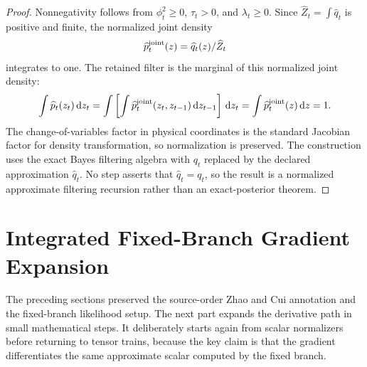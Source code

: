 \documentclass[11pt]{article}
\numberwithin{equation}{section}
\newcommand{\dd}{\,\mathrm d}
\begin{document}
\begin{proof}
Nonnegativity follows from
\(\phi_t^2\ge0\), \(\tau_t>0\), and \(\lambda_t\ge0\).  Since
\(\widehat Z_t=\int\widehat q_t\) is positive and finite, the normalized joint
density
\[
    \widehat p_t^{\rm joint}(z)
    =
    \widehat q_t(z)/\widehat Z_t
\]
integrates to one.  The retained filter is the marginal of this normalized
joint density:
\[
    \int \widehat p_t(z_t)\dd z_t
    =
    \int
    \left[
    \int \widehat p_t^{\rm joint}(z_t,z_{t-1})\dd z_{t-1}
    \right]\dd z_t
    =
    \int \widehat p_t^{\rm joint}(z)\dd z
    =
    1.
\]
The change-of-variables factor in physical coordinates is the standard
Jacobian factor for density transformation, so normalization is preserved.  The
construction uses the exact Bayes filtering algebra with \(q_t\) replaced by
the declared approximation \(\widehat q_t\).  No step asserts that
\(\widehat q_t=q_t\), so the result is a normalized approximate filtering
recursion rather than an exact-posterior theorem.
\end{proof}


\section{Integrated Fixed-Branch Gradient Expansion}

The preceding sections preserved the source-order Zhao and Cui \cite{zhao2024ttsequential} annotation and the
fixed-branch likelihood setup.  The next part expands the derivative path in
small mathematical steps.  It deliberately starts again from scalar
normalizers before returning to tensor trains, because the key claim is that
the gradient differentiates the same approximate scalar computed by the fixed
branch.
\end{document}
